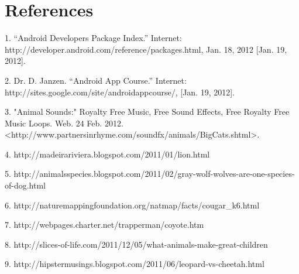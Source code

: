 


%
%
\section{References}
\begin{flushleft}
1. “Android Developers Package Index.” Internet: http://developer.android.com/reference/packages.html, Jan. 18, 2012 [Jan. 19, 2012].

2. Dr. D. Janzen. “Android App Course.” Internet: http://sites.google.com/site/androidappcourse/, [Jan. 19, 2012].

3. "Animal Sounds:" Royalty Free Music, Free Sound Effects, Free Royalty Free Music Loops. Web. 24 Feb. 2012. <http://www.partnersinrhyme.com/soundfx/animals/BigCats.shtml>.

4. http://madeirariviera.blogspot.com/2011/01/lion.html

5. http://animalsspecies.blogspot.com/2011/02/gray-wolf-wolves-are-one-species-of-dog.html

6. http://naturemappingfoundation.org/natmap/facts/cougar_k6.html

7. http://webpages.charter.net/trapperman/coyote.htm

8. http://slices-of-life.com/2011/12/05/what-animals-make-great-children%

9. http://hipstermusings.blogspot.com/2011/06/leopard-vs-cheetah.html

\end{flushleft}
